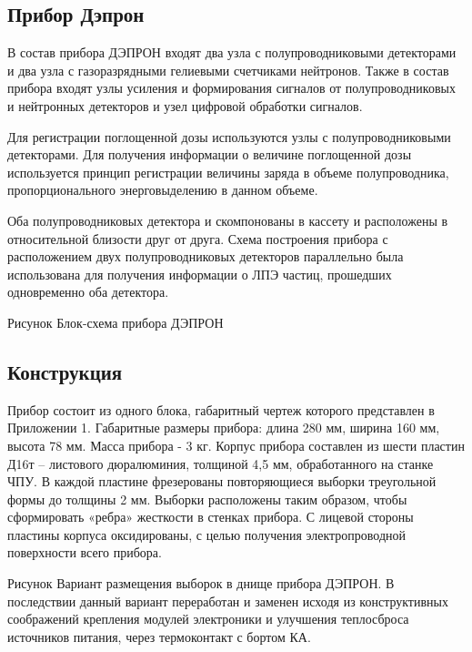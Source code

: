 \documentclass[a4paper,portrait,12pt]{article}
\begin{document}
{{{{\subsection*{	\textbf{ }\textbf{Прибор Дэпрон}}

В состав прибора ДЭПРОН входят два узла с полупроводниковыми детекторами и два узла с газоразрядными гелиевыми счетчиками нейтронов. Также в состав прибора входят узлы усиления и формирования сигналов от полупроводниковых и нейтронных детекторов и узел цифровой обработки сигналов.


Для регистрации поглощенной дозы используются узлы с полупроводниковыми детекторами. Для получения информации о величине поглощенной дозы используется принцип регистрации величины заряда в объеме полупроводника, пропорционального энерговыделению в данном объеме. 


Оба полупроводниковых детектора и скомпонованы в кассету и расположены в относительной близости друг от друга. Схема построения прибора с расположением двух полупроводниковых детекторов параллельно была использована для получения информации о ЛПЭ частиц, прошедших одновременно оба детектора. 


 





Рисунок Блок-схема прибора ДЭПРОН


\newpage



\subsection*{	\textbf{ }\textbf{Конструкция}}

Прибор состоит из одного блока, габаритный чертеж которого представлен в Приложении 1. Габаритные размеры прибора: длина  280 мм, ширина 160 мм, высота 78 мм. Масса прибора - 3 кг. Корпус прибора составлен из шести пластин Д16т -- листового дюралюминия, толщиной 4,5 мм, обработанного на станке ЧПУ. В каждой пластине фрезерованы повторяющиеся выборки треугольной формы до толщины 2 мм. Выборки расположены таким образом, чтобы сформировать «ребра» жесткости в стенках прибора. С лицевой стороны пластины корпуса оксидированы, с целью получения электропроводной поверхности всего прибора.


\begin{center}

\end{center}


\begin{center}
Рисунок Вариант размещения выборок в днище прибора ДЭПРОН. В последствии данный вариант переработан и заменен исходя из конструктивных соображений крепления модулей электроники и улучшения теплосброса источников питания, через термоконтакт с бортом КА.
\end{center}


}}}}
\end{document}
